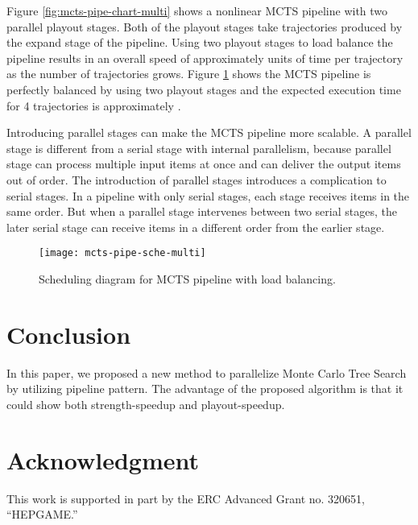 \documentclass[10pt, conference, compsocconf]{IEEEtran}
\begin{document}
Figure \ref{fig:mcts-pipe-chart-multi} shows a nonlinear MCTS pipeline with two parallel playout stages. Both of the playout stages take trajectories produced by the expand stage of the pipeline. Using two playout stages to load balance the pipeline results in an overall speed of approximately  units of time per trajectory as the number of trajectories grows. 
Figure \ref{fig:mcts-pipe-sche-multi} shows the MCTS pipeline is perfectly balanced by using two playout stages and the expected execution time for 4 trajectories is approximately .










Introducing parallel stages can make the MCTS pipeline more scalable. A parallel stage is different from a serial stage with internal parallelism, because parallel stage can process multiple input items at once and can deliver the output items out of order. The introduction of parallel stages introduces a complication to serial stages. In a pipeline with only serial stages, each stage receives items in the same order. But when a parallel stage intervenes between two serial stages, the later serial stage can receive items in a different order from the earlier stage.
\begin{figure}
\centering
\texttt{[image: mcts-pipe-sche-multi]}
\caption{Scheduling diagram for MCTS pipeline with load balancing.}
\label{fig:mcts-pipe-sche-multi}
\end{figure}

\section{Conclusion}
In this paper, we proposed a new method to parallelize Monte Carlo Tree Search by utilizing pipeline pattern. The advantage of the proposed algorithm is that it could show both strength-speedup and playout-speedup. 
\label{sec:conclusion}

\section*{Acknowledgment}
This work is supported in part by the ERC Advanced Grant no. 320651, “HEPGAME.”








\end{document}
